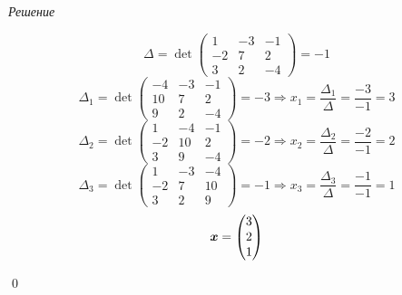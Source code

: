 \documentclass[a4paper,12pt]{article}
\theoremstyle{definition}
\theoremstyle{remark}
\theoremstyle{remark}
\begin{document}
  \emph{Решение}
  
  \[
    \Delta = \det \begin{pmatrix}
      1 & -3 & -1\\
      -2 & 7 & 2\\
      3 & 2 & -4
    \end{pmatrix} = -1
  \]
  \[
    \Delta_1 = \det \begin{pmatrix}
      -4 & -3 & -1\\
      10 & 7 & 2\\
      9 & 2 & -4
    \end{pmatrix} = -3 \Rightarrow x_1 = \frac{\Delta_1}{\Delta} = \frac{-3}{-1} = 3
  \]
  \[
    \Delta_2 = \det \begin{pmatrix}
      1 & -4 & -1\\
      -2 & 10 & 2\\
      3 & 9 & -4
    \end{pmatrix} = -2 \Rightarrow x_2 = \frac{\Delta_2}{\Delta} = \frac{-2}{-1} = 2
  \]
  \[
    \Delta_3 = \det \begin{pmatrix}
      1 & -3 & -4\\
      -2 & 7 & 10\\
      3 & 2 & 9
    \end{pmatrix} = -1 \Rightarrow x_3 = \frac{\Delta_3}{\Delta} = \frac{-1}{-1} = 1
  \]
  \[
    \boldsymbol x = \begin{pmatrix}
      3\\ 2\\ 1
    \end{pmatrix}
  \]
  
  \qed
  
\end{document}
